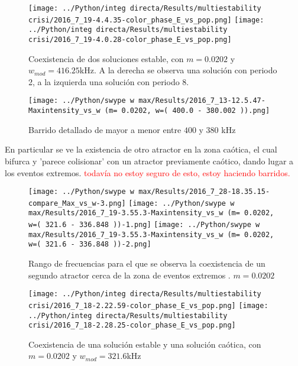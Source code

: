 	
	\begin{figure}[htp]
		\texttt{[image: ../Python/integ directa/Results/multiestability crisi/2016\_7\_19-4.4.35-color\_phase\_E\_vs\_pop.png]}
		\texttt{[image: ../Python/integ directa/Results/multiestability crisi/2016\_7\_19-4.0.28-color\_phase\_E\_vs\_pop.png]}
		\caption{Coexistencia de dos soluciones estable, con $m=0.0202$ y $w_{mod}=416.25$kHz. A la derecha se observa una solución con periodo 2, a la izquierda una solución con periodo 8.}
	\end{figure}
	
	
	
	\begin{figure}[htp]
		\begin{center}
			\texttt{[image: ../Python/swype w max/Results/2016\_7\_13-12.5.47-Maxintensity\_vs\_w (m= 0.0202, w=( 400.0 - 380.002 )).png]}
		\end{center}
		\caption{Barrido detallado  de mayor a menor entre $400$ y $380$ kHz }
	\end{figure}	
	
	En particular se ve la existencia de otro atractor en la zona caótica, el cual bifurca y 'parece colisionar' con un atractor previamente caótico, dando lugar a los eventos extremos.
	\textcolor{red}{ todavía no estoy seguro de esto, estoy haciendo barridos.}
	
	
	\begin{figure}[htp]
		\begin{center}
			\texttt{[image: ../Python/swype w max/Results/2016\_7\_28-18.35.15-compare\_Max\_vs\_w-3.png]}
			\texttt{[image: ../Python/swype w max/Results/2016\_7\_19-3.55.3-Maxintensity\_vs\_w (m= 0.0202, w=( 321.6 - 336.848 ))-1.png]}
			\texttt{[image: ../Python/swype w max/Results/2016\_7\_19-3.55.3-Maxintensity\_vs\_w (m= 0.0202, w=( 321.6 - 336.848 ))-2.png]}
		\end{center}
		\caption{Rango de frecuencias para el que se observa la coexistencia de un segundo atractor  cerca de la zona de eventos extremos . $m=0.0202$ }
		\label{rango coex m 202}
	\end{figure}		
	
	\begin{figure}[htp]
		\texttt{[image: ../Python/integ directa/Results/multiestability crisi/2016\_7\_18-2.22.59-color\_phase\_E\_vs\_pop.png]}
		\texttt{[image: ../Python/integ directa/Results/multiestability crisi/2016\_7\_18-2.28.25-color\_phase\_E\_vs\_pop.png]}
		\caption{Coexistencia de una solución estable y una solución caótica, con $m=0.0202$ y $w_{mod}=321.6$kHz}
	\end{figure}
	
